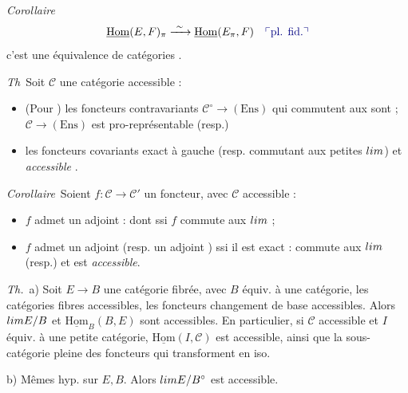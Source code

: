 \documentclass[11pt,a4paper]{article}
\begin{document}
\emph{Corollaire}\  
\[
  \underline{\mathrm{Hom}}(E, F)_{\pi} \xrightarrow{\ \sim\ }
  \underline{\mathrm{Hom}}(E_{\pi}, F) \quad \add{\text{pl. fid.}}
\]
c'est une équivalence de catégories \struck{\ill{}}  .

\emph{Th}\ Soit $\mathcal{C}$ une catégorie accessible  :
\begin{itemize}
  \item[a)] (Pour \ill{} \ill{}) les foncteurs contravariants $\mathcal{C}^{\circ}
    \to (\mathrm{Ens})$  qui commutent aux \ill{} \ill{} sont
    \struck{\ill{}} \ill{} ; $\mathcal{C} \to (\mathrm{Ens})$ est
    pro-représentable (resp.) \ill{}
  \item[b)] les foncteurs covariants   exact à gauche (resp. commutant aux petites
    $\varprojlim$) et \emph{accessible} .
\end{itemize}

\emph{Corollaire}\ Soient $f : \mathcal{C} \to \mathcal{C}'$ un
foncteur, avec $\mathcal{C}$ accessible  :
\begin{itemize}
  \item[a)] $f$ admet un adjoint : dont ssi $f$ commute aux
    \emph{$\varprojlim$}  ;
  \item[b)] $f$ admet un adjoint \struck{\ill{}} (resp. un adjoint
    \ill{}) ssi il est exact : \ill{} commute aux 
    $\varprojlim$ (resp.) et est \emph{accessible}.
\end{itemize}

\emph{Th.}\ a) Soit $E \to B$ une catégorie fibrée, avec $B$ équiv. à
une   catégorie, les catégories fibres
accessibles, les foncteurs changement de base accessibles. Alors
$\varprojlim E/B$ et $\underline{\mathrm{Hom}}_{B}(B, E)$ sont accessibles.
En particulier, si $\mathcal{C}$ accessible et $I$ équiv. à une petite
catégorie, $\underline{\mathrm{Hom}}(I, \mathcal{C})$ est accessible, ainsi
que la sous-catégorie pleine des foncteurs qui transforment \ill{} en iso.

b) Mêmes hyp. sur $E, B$. Alors $\varinjlim E/B^{\circ}$ est accessible.
\end{document}

